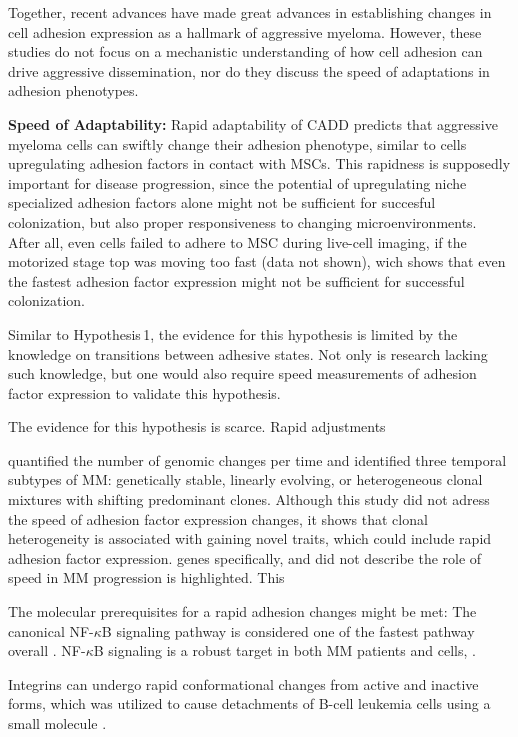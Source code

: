Together, recent advances have made great advances in establishing changes in
cell adhesion expression as a hallmark of aggressive myeloma. However, these
studies do not focus on a mechanistic understanding of how cell adhesion can
drive aggressive dissemination, nor do they discuss the speed of adaptations in
adhesion phenotypes.

\textbf{Speed of Adaptability:}
Rapid adaptability of \ac{CADD} predicts that aggressive myeloma cells can
swiftly change their adhesion phenotype, similar to \INA cells upregulating
adhesion factors in contact with \acp{MSC}. This rapidness is supposedly
important for disease progression, since the potential of upregulating niche
specialized adhesion factors alone might not be sufficient for succesful
colonization, but also proper responsiveness to changing microenvironments. 
After all, even \INA cells failed to adhere to \ac{MSC} during live-cell imaging,
if the motorized stage top was moving too fast (data not shown), wich shows that
even the fastest adhesion factor expression might not be sufficient for
successful colonization.

Similar to Hypothesis\,1, the evidence for this hypothesis is limited by
the knowledge on transitions between adhesive states. Not only is research lacking
such knowledge, but one would also require speed measurements of adhesion factor
expression to validate this hypothesis. 

The
evidence for this hypothesis is scarce.
Rapid adjustments 

\citet{keatsClonalCompetitionAlternating2012} quantified the number of genomic
changes per time and identified three temporal subtypes of MM: genetically
stable, linearly evolving, or heterogeneous clonal mixtures with shifting
predominant clones. Although this study did not adress the speed of adhesion
factor expression changes, it shows that clonal heterogeneity is associated with
gaining novel traits, which could include rapid adhesion factor expression.
genes specifically, and did not describe the role of speed in MM progression is
highlighted. This

The molecular prerequisites  for a rapid adhesion changes might be met: 
The
canonical NF-$\kappa$B signaling pathway is considered one of the fastest
pathway overall \cite{gallego-sellesFastRegulationNFkB2022,
zarnegarNoncanonicalNFkBActivation2008}. NF-$\kappa$B signaling is a
robust target in both MM patients and \INA cells,
\cite{sarinEvaluatingEfficacyMultiple2020}.

Integrins can undergo rapid conformational changes from active and inactive
forms, which was utilized to cause detachments of B-cell leukemia cells
using a small molecule \cite{ruanVitroVivoEffects2022}.


